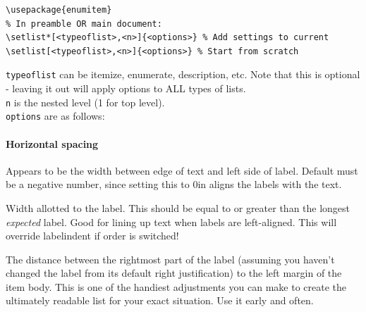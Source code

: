 \documentclass{article}
\begin{document}
\begin{lstlisting}
\usepackage{enumitem}
% In preamble OR main document:
\setlist*[<typeoflist>,<n>]{<options>} % Add settings to current
\setlist[<typeoflist>,<n>]{<options>} % Start from scratch
\end{lstlisting}
\verb|typeoflist| can be itemize, enumerate, description, etc.
Note that this is optional - leaving it out will apply options to ALL
types of lists.\\
\verb|n| is the nested level (1 for top level).\\
\verb|options| are as follows:

\paragraph{Horizontal spacing}
\begin{description}[labelindent=2cm, leftmargin=\labelindent,
        ]
    \item [labelindent] Appears to be the width between edge of text
        and left side of label. Default must be a negative number, since
        setting this to 0in aligns the labels with the text.
    \item [labelwidth]
        Width allotted to the label. This should be equal to or greater than
        the longest \emph{expected} label. Good for lining up text when labels
        are left-aligned. This will override labelindent if order is switched!
    \item [labelsep]
        The distance between the rightmost part of the label (assuming
        you haven't changed the label from its default right
        justification) to the left margin of the item body. This is
        one of the handiest adjustments you can make to create the
        ultimately readable list for your exact situation. Use it
        early and often.



\end{description}
\end{document}
